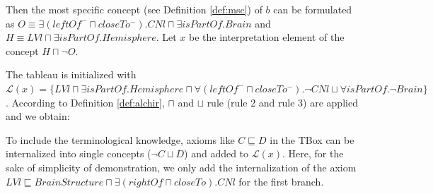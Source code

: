 \documentclass{article}
\begin{document}
Then the most specific concept (see Definition \ref{def:msc}) of  $b$ can be formulated as $O\equiv \exists (leftOf^-\sqcap closeTo^-). CNl\sqcap \exists isPartOf.Brain$ and $H\equiv LVl\sqcap \exists isPartOf.Hemisphere$.
Let $x$ be the interpretation element of the concept $H\sqcap \neg O$.


The tableau is initialized with $\mathcal{L}(x)=\{ LVl\sqcap \exists isPartOf.Hemisphere\sqcap \forall (leftOf^-\sqcap closeTo^-).\neg CNl\sqcup \forall isPartOf.\neg Brain\}$.
According to Definition \ref{def:alchir}, $\sqcap$ and $\sqcup$ rule (rule 2 and rule 3) are applied and we obtain:
\begin{center}
\end{center}

To include the terminological knowledge, axioms like $C\sqsubseteq D$ in the TBox can be internalized into single concepts ($\neg C\sqcup D$) and added to $\mathcal{L}(x)$. Here, for the sake of simplicity 
of demonstration, we only add the internalization of the axiom $LVl \sqsubseteq BrainStructure \sqcap  \exists (rightOf \sqcap closeTo). CNl$ for the first branch.
\begin{center}
\end{center}
\end{document}
